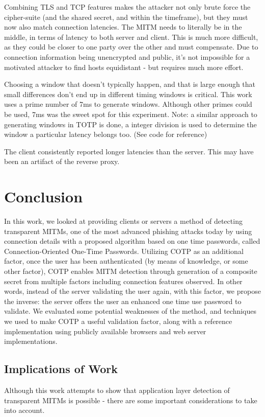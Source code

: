 \documentclass[a4paper, 11pt]{article} 				%
\begin{document}
Combining TLS and TCP features makes the attacker not only brute force the cipher-suite (and the shared secret, and within the timeframe), but they must now also match connection latencies. The MITM needs to literally be in the middle, in terms of latency to both server and client. This is much more difficult, as they could be closer to one party over the other and must compensate. Due to connection information being unencrypted and public, it's not impossible for a motivated attacker to find hosts equidistant - but requires much more effort.

Choosing a window that doesn't typically happen, and that is large enough that small differences don't end up in different timing windows is critical. This work uses a prime number of 7ms to generate windows. Although other primes could be used, 7ms was the sweet spot for this experiment. Note: a similar approach to generating windows in TOTP is done, a integer division is used to determine the window a particular latency belongs too. (See code for reference)

The client consistently reported longer latencies than the server. This may have been an artifact of the reverse proxy.




\section{Conclusion}
In this work, we looked at providing clients or servers a method of detecting transparent MITMs, one of the most advanced phishing attacks today by using connection details with a proposed algorithm based on one time passwords, called Connection-Oriented One-Time Passwords. Utilizing COTP as an additional factor, once the user has been authenticated (by means of knowledge, or some other factor), COTP enables MITM detection through generation of a composite secret from multiple factors including connection features observed. In other words, instead of the server validating the user again, with this factor, we propose the inverse: the server offers the user an enhanced one time use password to validate. We evaluated some potential weaknesses of the method, and techniques we used to make COTP a useful validation factor, along with a reference implementation using publicly available browsers and web server implementations.

\subsection{Implications of Work}
Although this work attempts to show that application layer detection of transparent MITMs is possible - there are some important considerations to take into account.
\end{document}
